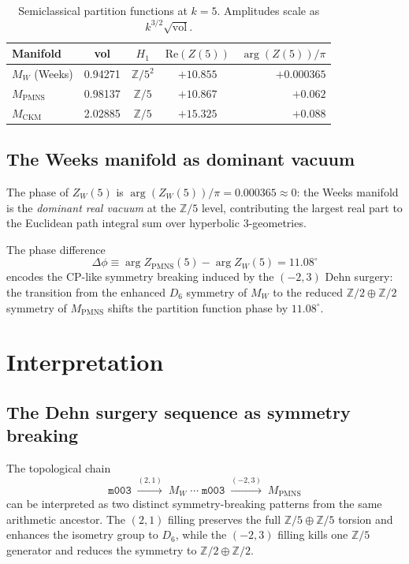 \documentclass[12pt]{article}
\theoremstyle{definition}
\begin{document}
\begin{table}[htbp]
\centering
\caption{Semiclassical partition functions at $k=5$.
Amplitudes scale as $k^{3/2}\sqrt{\mathrm{vol}}$.}
\label{tab:Z_k5}
\begin{tabular}{lcccr}
\toprule
Manifold & vol & $H_1$ & $\mathrm{Re}(Z(5))$ & $\arg(Z(5))/\pi$ \\
\midrule
$M_W$ (Weeks)   & 0.94271 & $\mathbb{Z}/5^2$ & $+10.855$ & $+0.000365$ \\
$M_\mathrm{PMNS}$ & 0.98137 & $\mathbb{Z}/5$   & $+10.867$ & $+0.062$ \\
$M_\mathrm{CKM}$  & 2.02885 & $\mathbb{Z}/5$   & $+15.325$ & $+0.088$ \\
\bottomrule
\end{tabular}
\end{table}

\subsection{The Weeks manifold as dominant vacuum}

The phase of $Z_W(5)$ is $\arg(Z_W(5))/\pi = 0.000365 \approx 0$:
the Weeks manifold is the \emph{dominant real vacuum} at the
$\mathbb{Z}/5$ level, contributing the largest real part to the
Euclidean path integral sum over hyperbolic 3-geometries.

The phase difference
\begin{equation}
  \Delta\phi \equiv \arg Z_\mathrm{PMNS}(5)
  - \arg Z_W(5) = 11.08^\circ
  \label{eq:phase_diff}
\end{equation}
encodes the CP-like symmetry breaking induced by the $(-2,3)$ Dehn
surgery: the transition from the enhanced $D_6$ symmetry of $M_W$ to
the reduced $\mathbb{Z}/2\oplus\mathbb{Z}/2$ symmetry of $M_\mathrm{PMNS}$
shifts the partition function phase by $11.08^\circ$.

\section{Interpretation}
\label{sec:interp}

\subsection{The Dehn surgery sequence as symmetry breaking}

The topological chain
\[
  \texttt{m003}\;\xrightarrow{(2,1)}\;M_W\;\cdots\;
  \texttt{m003}\;\xrightarrow{(-2,3)}\;M_\mathrm{PMNS}
\]
can be interpreted as two distinct symmetry-breaking patterns from
the same arithmetic ancestor. The $(2,1)$ filling preserves the full
$\mathbb{Z}/5\oplus\mathbb{Z}/5$ torsion and enhances the isometry
group to $D_6$, while the $(-2,3)$ filling kills one $\mathbb{Z}/5$
generator and reduces the symmetry to $\mathbb{Z}/2\oplus\mathbb{Z}/2$.
\end{document}

